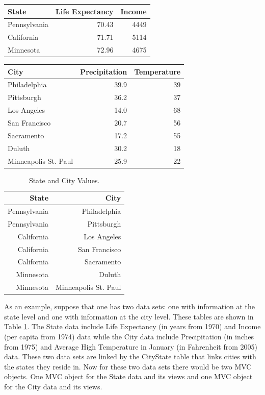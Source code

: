 \documentclass{article}[11pt]
\begin{document}
\small
\begin{tabular}[t]{ | l | r | r | }
  \hline
  State & Life Expectancy & Income \\ \hline
  Pennsylvania & 70.43 & 4449 \\ \hline
  California & 71.71 & 5114 \\ \hline
  Minnesota & 72.96 & 4675 \\ \hline
\end{tabular}
\hspace{10pt}
\begin{tabular}[t]{ | l | r | r | }
  \hline
  City & Precipitation & Temperature \\ \hline
  Philadelphia & 39.9 & 39 \\ \hline
  Pittsburgh & 36.2 & 37 \\ \hline
  Los Angeles & 14.0 & 68 \\ \hline
  San Francisco & 20.7 & 56 \\ \hline
  Sacramento & 17.2 & 55 \\ \hline
  Duluth & 30.2 & 18 \\ \hline
  Minneapolis St. Paul & 25.9 & 22 \\ \hline
\end{tabular}

\begin{table}[h]
  \begin{center}
    \begin{tabular}{ | r | r | }
      \hline
      State & City \\ \hline
      Pennsylvania & Philadelphia \\ \hline
      Pennsylvania & Pittsburgh \\ \hline
      California & Los Angeles \\ \hline
      California & San Francisco \\ \hline
      California & Sacramento \\ \hline
      Minnesota & Duluth \\ \hline
      Minnesota & Minneapolis St. Paul \\ \hline
    \end{tabular}
    \caption{State and City Values.}\label{Tab:CityState}
  \end{center}
\end{table}

\normalsize
As an example, suppose that one has two data sets: one with information at the
state level and one with information at the city level.  These tables are
shown in Table \ref{Tab:CityState}.  The State data include Life Expectancy
(in years from 1970) and Income (per capita from 1974) data
while the City data include Precipitation (in inches from 1975) and Average
High Temperature in January (in Fahrenheit from 2005)
data.  These two data sets are linked by the CityState table that links cities
with the states they reside in.  Now for these two data sets there would be
two MVC objects.  One MVC object for the State data and its views and one MVC
object for the City data and its views. 
\end{document}
